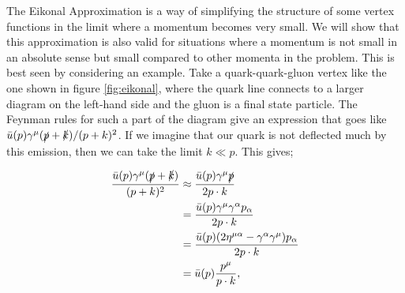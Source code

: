 The Eikonal Approximation is a way of simplifying the structure of some vertex functions in the limit where a momentum becomes very small. We will show that this approximation is also valid for situations where a momentum is not small in an absolute sense but small compared to other momenta in the problem. This is best seen by considering an example. Take a quark-quark-gluon vertex like the one shown in figure \ref{fig:eikonal}, where the quark line connects to a larger diagram on the left-hand side and the gluon is a final state particle. The Feynman rules for such a part of the diagram give an expression that goes like $\bar{u}(p) \gamma^\mu (\slashed{p} + \slashed{k})/(p+k)^2$. If we imagine that our quark is not deflected much by this emission, then we can take the limit $k \ll p$. This gives;

\begin{equation}
\begin{split}
\frac{\bar{u}(p) \gamma^\mu (\slashed{p}+\slashed{k})}{(p+k)^2} &\approx \frac{\bar{u}(p)\gamma^\mu \slashed{p}}{2 p \cdot k} \\
&= \frac{\bar{u}(p)\gamma^\mu \gamma^\alpha p_\alpha}{2 p \cdot k} \\
&=  \frac{\bar{u}(p)(2 \eta^{\mu \alpha} - \gamma^\alpha \gamma^\mu) p_\alpha}{2 p \cdot k} \\
&= \bar{u}(p) \frac{p^\mu}{p \cdot k},
\end{split}
\end{equation}

